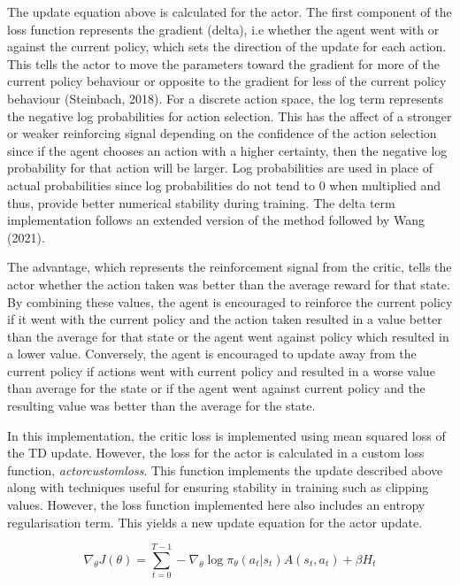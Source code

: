 \documentclass{article}
\begin{document}
The update equation above is calculated for the actor. The first component of the loss function represents the gradient (delta), i.e whether the agent went with or against the current policy, which sets the direction of the update for each action. This tells the actor to move the parameters toward the gradient for more of the current policy behaviour or opposite to the gradient for less of the current policy behaviour (Steinbach, 2018). For a discrete action space, the log term represents the negative log probabilities for action selection. This has the affect of a stronger or weaker reinforcing signal depending on the confidence of the action selection since if the agent chooses an action with a higher certainty, then the negative log probability for that action will be larger. Log probabilities are used in place of actual probabilities since log probabilities do not tend to 0 when multiplied and thus, provide better numerical stability during training. The delta term implementation follows an extended version of the method followed by Wang (2021).

The advantage, which represents the reinforcement signal from the critic, tells the actor whether the action taken was better than the average reward for that state. By combining these values, the agent is encouraged to reinforce the current policy if it went with the current policy and the action taken resulted in a value better than the average for that state or the agent went against policy which resulted in a lower value. Conversely, the agent is encouraged to update away from the current policy if actions went with current policy and resulted in a worse value than average for the state or if the agent went against current policy and the resulting value was better than the average for the state.

In this implementation, the critic loss is implemented using mean squared loss of the TD update. However, the loss for the actor is calculated in a custom loss function, \emph{actorcustomloss}. This function implements the update described above along with techniques useful for ensuring stability in training such as clipping values. However, the loss function implemented here also includes an entropy regularisation term. This yields a new update equation for the actor update.

\begin{equation}
\nabla_{\theta} J(\theta) = \sum_{t=0}^{T-1}-\nabla_{\theta}\log{\pi_{\theta}}(a_{t} | s_{t}) A(s_{t}, a_{t}) + \beta H_{t}
\end{equation}
\end{document}
